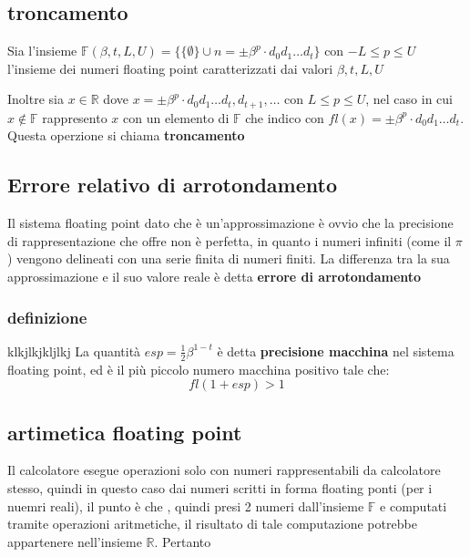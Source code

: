 \subsection{troncamento}

Sia l'insieme $\mathbb{F}(\beta, t, L, U) =\{ \{\emptyset\} \cup n = \pm \beta^p \cdot d_0 d_1 \dots d_t  \} $ con $-L \leq p \leq U$ l'insieme dei numeri floating point caratterizzati dai valori $\beta, t, L, U$

Inoltre sia $x \in \mathbb{R}$ dove $x = \pm \beta^p \cdot d_0 d_1 \dots d_t, d_{t+1}, \dots$ con $L\leq p \leq U$, nel caso in cui $x \notin \mathbb{F} $ rappresento $x$ con un elemento di $\mathbb{F} $ che indico con $fl(x) = \pm \beta^p \cdot d_0 d_1 \dots d_t$. Questa operzione si chiama \textbf{troncamento}

\subsection{Errore relativo di arrotondamento}
Il sistema floating point dato che è un'approssimazione è ovvio che la precisione di rappresentazione che offre non è perfetta, in quanto i numeri infiniti (come il $\pi$) vengono delineati con una serie finita di numeri finiti. La differenza tra la sua approssimazione e il suo valore reale è detta \textbf{errore di arrotondamento}  
\subsubsection{definizione}
klkjlkjkljlkj
 La quantità $esp=\frac{1}{2}\beta^{1-t}$ è detta  \textbf{precisione macchina} nel sistema floating point, ed è il più piccolo numero macchina positivo tale che: 
 \[
    fl(1+esp)>1
 \]

\subsection{artimetica floating point}
Il calcolatore esegue operazioni solo con numeri rappresentabili da calcolatore stesso, quindi in questo caso dai numeri scritti in forma floating ponti (per i nuemri reali), il punto è che , quindi presi 2 numeri dall'insieme $\mathbb{F}$ e computati tramite operazioni aritmetiche, il risultato di tale computazione potrebbe appartenere nell'insieme $\mathbb{R}$. Pertanto 
